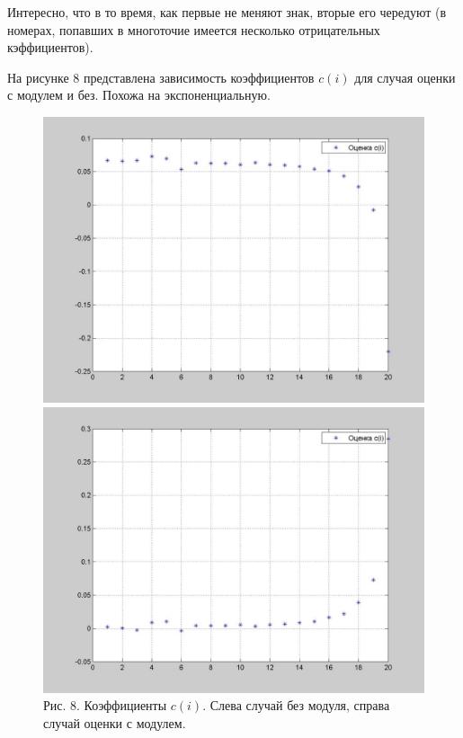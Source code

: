 \documentclass[12pt]{report}
\begin{document}
Интересно, что в то время, как первые не меняют знак, вторые его чередуют (в номерах, попавших в многоточие имеется несколько отрицательных кэффициентов). 

На рисунке 8 представлена зависимость коэффициентов $c(i)$ для случая оценки с модулем и без. Похожа на экспоненциальную.
\begin{figure}[!ht]
\begin{center}
\includegraphics[scale=0.2]{CoefficientsEstimation20}
\includegraphics[scale=0.2]{CoefficientsEstimation20Fabs}
\\Рис. 8. Коэффициенты $c(i)$. Слева случай без модуля, справа случай оценки с модулем.
\end{center}
\end{figure}
\end{document}
